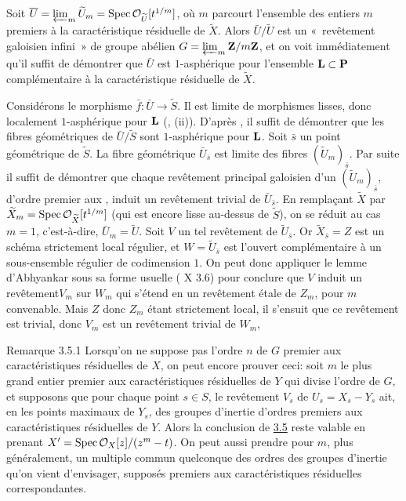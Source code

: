 \documentclass[10pt]{../fichiers-configuration-latex/smfart}
\begin{document}
Soit
$\overline{U}=\varprojlim_m\widetilde{U}_{m}=\operatorname{Spec} {\mathcal O}_{\widetilde{U}}[t^{1/m}]$,
où $m$ parcourt l'ensemble des entiers $m$ premiers à la
caractéristique résiduelle de $\widetilde{X}$. Alors
$\bar{U}/\widetilde{U}$ est un « revêtement galoisien infini »  de
groupe abélien $G=\varprojlim_m \mathbf{Z}/m\mathbf{Z}$, et on voit
immédiatement qu'il suffit de démontrer que $\bar{U}$ est
$1$-asphérique pour l'ensemble $\mathbf{L}\subset \mathbf{P}$
complémentaire à la caractéristique résiduelle de $\widetilde{X}$.

Considérons le morphisme $\bar{f}:\bar{U}\rightarrow
\widetilde{S}$. Il est limite de morphismes lisses, donc localement
$1$-asphérique pour $\mathbf{L}$ (, 
(ii)). D'après , il suffit de démontrer que les fibres
géométriques de $\bar{U}/\widetilde{S}$ sont $1$-asphérique pour
$\mathbf{L}$. Soit $\bar{s}$ un point géométrique de $\widetilde{S}$. La
fibre géométrique $\bar{U}_{\bar{s}}$ est limite des fibres
$(\widetilde{U}_m)_{\bar{s}}$. Par suite il suffit de démontrer que
chaque revêtement principal galoisien d'un
$(\widetilde{U}_m)_{\bar{s}}$, d'ordre premier aux ,
induit un revêtement trivial de $\bar{U}_{\bar{s}}$. En remplaçant
$\widetilde{X}$ par
$\widetilde{X}_m=\operatorname{Spec} {\mathcal O}_{\widetilde{X}}[t^{1/m}]$ (qui est
encore lisse au-dessus de $\widetilde{S}$), on se réduit au cas $m=1$,
c'est-à-dire, $\bar{U}_m=\widetilde{U}$. Soit $V$ un tel revêtement de
$\widetilde{U}_{\bar{s}}$. Or $\widetilde{X}_{\bar{s}}=Z$ est un
schéma strictement local régulier, et $W=\widetilde{U}_{\bar{s}}$ est
l'ouvert complémentaire à un sous-ensemble régulier de codimension
$1$. On peut donc appliquer le lemme d'Abhyankar sous sa forme usuelle
( X 3.6) pour conclure que $V$ induit un
revêtement\pageoriginale $V_m$ sur $W_m$ qui s'étend en un revêtement
étale de $Z_m$, pour $m$ convenable. Mais $Z$ donc $Z_m$ étant
strictement local, il s'ensuit que ce revêtement est trivial, donc
$V_m$ est un revêtement trivial de $W_m$, \cqfd

\begin{enonce*}[remark]{Remarque 3.5.1}
Lorsqu'on ne suppose pas l'ordre $n$ de $G$ premier aux
caractéristiques résiduelles de $X$, on peut encore prouver ceci: soit
$m$ le plus grand entier premier aux caractéristiques résiduelles de
$Y$ qui divise l'ordre de $G$, et supposons que pour chaque point
$s\in S$, le revêtement $V_s$ de $U_s=X_s-Y_s$ ait, en les points
maximaux de $Y_s$, des groupes d'inertie d'ordres premiers aux
caractéristiques résiduelles de $Y$. Alors la conclusion de \hyperref[XVI.lem3.5]{3.5} reste
valable en prenant $X'=\operatorname{Spec} {\mathcal O}_X[z]/(z^m-t)$. On peut aussi
prendre pour $m$, plus généralement, un multiple commun quelconque des
ordres des groupes d'inertie qu'on vient d'envisager, supposés
premiers aux caractéristiques résiduelles correspondantes.
\end{enonce*}
\end{document}
